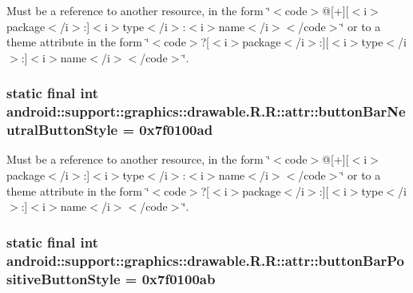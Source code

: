 Must be a reference to another resource, in the form \char`\"{}$<$code$>$@\mbox{[}+\mbox{]}\mbox{[}$<$i$>$package$<$/i$>$:\mbox{]}$<$i$>$type$<$/i$>$:$<$i$>$name$<$/i$>$$<$/code$>$\char`\"{} or to a theme attribute in the form \char`\"{}$<$code$>$?\mbox{[}$<$i$>$package$<$/i$>$:\mbox{]}\mbox{[}$<$i$>$type$<$/i$>$:\mbox{]}$<$i$>$name$<$/i$>$$<$/code$>$\char`\"{}. \hypertarget{classandroid_1_1support_1_1graphics_1_1drawable_1_1_r_1_1attr_d54069c18638bb127fe203857fcbf324}{
\subsubsection[{buttonBarNeutralButtonStyle}]{\setlength{\rightskip}{0pt plus 5cm}static final int android::support::graphics::drawable.R.R::attr::buttonBarNeutralButtonStyle = 0x7f0100ad}}
\label{classandroid_1_1support_1_1graphics_1_1drawable_1_1_r_1_1attr_d54069c18638bb127fe203857fcbf324}


Must be a reference to another resource, in the form \char`\"{}$<$code$>$@\mbox{[}+\mbox{]}\mbox{[}$<$i$>$package$<$/i$>$:\mbox{]}$<$i$>$type$<$/i$>$:$<$i$>$name$<$/i$>$$<$/code$>$\char`\"{} or to a theme attribute in the form \char`\"{}$<$code$>$?\mbox{[}$<$i$>$package$<$/i$>$:\mbox{]}\mbox{[}$<$i$>$type$<$/i$>$:\mbox{]}$<$i$>$name$<$/i$>$$<$/code$>$\char`\"{}. \hypertarget{classandroid_1_1support_1_1graphics_1_1drawable_1_1_r_1_1attr_28155cc159c9e4e1502ba7c671477125}{
\subsubsection[{buttonBarPositiveButtonStyle}]{\setlength{\rightskip}{0pt plus 5cm}static final int android::support::graphics::drawable.R.R::attr::buttonBarPositiveButtonStyle = 0x7f0100ab}}
\label{classandroid_1_1support_1_1graphics_1_1drawable_1_1_r_1_1attr_28155cc159c9e4e1502ba7c671477125}


